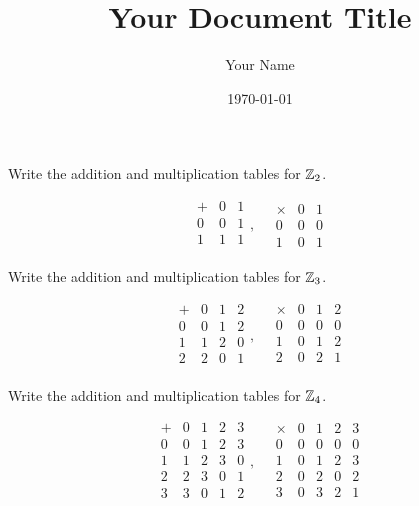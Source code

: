 \documentclass{article}
\title{Your Document Title}
\author{Your Name}
\date{\today} %
\begin{document}
\maketitle

\begin{problem}
Write the addition and multiplication tables for $\mathbb{Z}_2$.
\end{problem}

$$\begin{array}{c|cc}
    + & 0 & 1 \\
    \hline
    0 & 0 & 1 \\
    1 & 1 & 1 \\
  \end{array}, \quad
  \begin{array}{c|cc}
    \times & 0 & 1 \\
    \hline
    0      & 0 & 0 \\
    1      & 0 & 1
  \end{array}$$

\begin{problem}
Write the addition and multiplication tables for $\mathbb{Z}_3$.
\end{problem}

$$\begin{array}{c|ccc}
    + & 0 & 1 & 2 \\
    \hline
    0 & 0 & 1 & 2 \\
    1 & 1 & 2 & 0 \\
    2 & 2 & 0 & 1 \\
  \end{array}, \quad
  \begin{array}{c|ccc}
    \times & 0 & 1 & 2 \\
    \hline
    0      & 0 & 0 & 0 \\
    1      & 0 & 1 & 2 \\
    2      & 0 & 2 & 1 \\
  \end{array}$$

\begin{problem}
Write the addition and multiplication tables for $\mathbb{Z}_4$.
\end{problem}

$$\begin{array}{c|cccc}
    + & 0 & 1 & 2 & 3 \\
    \hline
    0 & 0 & 1 & 2 & 3 \\
    1 & 1 & 2 & 3 & 0 \\
    2 & 2 & 3 & 0 & 1 \\
    3 & 3 & 0 & 1 & 2 \\
  \end{array}, \quad
  \begin{array}{c|cccc}
    \times & 0 & 1 & 2 & 3 \\
    \hline
    0      & 0 & 0 & 0 & 0 \\
    1      & 0 & 1 & 2 & 3 \\
    2      & 0 & 2 & 0 & 2 \\
    3      & 0 & 3 & 2 & 1 \\
  \end{array}$$
\end{document}
